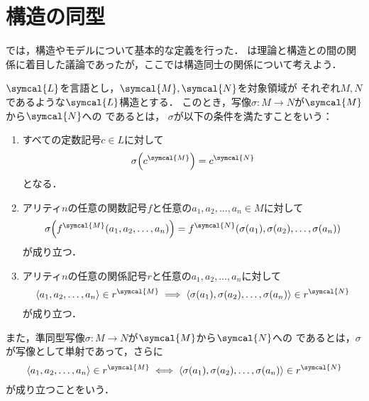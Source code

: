 \section{構造の同型} \label{sec:isomorphic}

では，構造やモデルについて基本的な定義を行った．
は理論と構造との間の関係に着目した議論であったが，ここでは構造同士の関係について考えよう．

\begin{Def} \label{Def:isomorphic}
	\(\symcal{L}\)を言語とし，\(\symcal{M}, \symcal{N}\)を対象領域が
	それぞれ\(M, N\)であるような\(\symcal{L}\)構造とする．
	このとき，写像\(\sigma \colon M \to N\)が\(\symcal{M}\)から\(\symcal{N}\)への%
	であるとは，
	\(\sigma\)が以下の条件を満たすことをいう：
	\begin{enumerate}
		\item すべての定数記号\(c \in L\)に対して
		      \begin{equation}
			      \apply{\sigma}{\interpretation{\symcal{M}}{c}} = \interpretation{\symcal{N}}{c}
			      \label{eq:constanthomorphism}
		      \end{equation}
		      となる．
		\item アリティ\(n\)の任意の関数記号\(f\)と任意の\(a_1, a_2, \dots, a_n \in M\)に対して
		      \begin{equation}
			      \apply{\sigma}{\apply{\interpretation{\symcal{M}}{f}}{a_1, a_2, \dots, a_n}}
			      = \apply{\interpretation{\symcal{N}}{f}}{
				      \apply{\sigma}{a_1}, \apply{\sigma}{a_2}, \dots, \apply{\sigma}{a_n}
			      }
			      \label{eq:functionhomorphism}
		      \end{equation}
		      が成り立つ．
		\item アリティ\(n\)の任意の関係記号\(r\)と任意の\(a_1, a_2, \dots, a_n\)に対して
		      \begin{equation}
			      \pair{a_1, a_2, \dots, a_n} \in \interpretation{\symcal{M}}{r}
			      \metaimplies \pair{\apply{\sigma}{a_1}, \apply{\sigma}{a_2}, \dots, \apply{\sigma}{a_n}} \in \interpretation{\symcal{N}}{r}
			      \label{eq:relationhomorphism}
		      \end{equation}
		      が成り立つ．
	\end{enumerate}

	また，準同型写像\(\sigma \colon M \to N\)が\(\symcal{M}\)から\(\symcal{N}\)への%
	であるとは，\(\sigma\)が写像として単射であって，さらに
	\begin{equation}
		\pair{a_1, a_2, \dots, a_n} \in \interpretation{\symcal{M}}{r}
		\metaequivalent \pair{\apply{\sigma}{a_1}, \apply{\sigma}{a_2}, \dots, \apply{\sigma}{a_n}} \in \interpretation{\symcal{N}}{r}
		\label{eq:relationembedding}
	\end{equation}
	が成り立つことをいう．


\end{Def}
